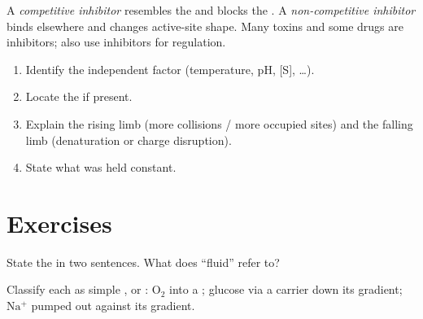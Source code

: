 \begin{definition}[Inhibitors]\label{def:g10:membranes-enzymes:inhibitors}
A \emph{competitive inhibitor} resembles the
 and blocks the . A
\emph{non-competitive inhibitor} binds
elsewhere and changes active-site shape. Many toxins and some drugs are
 inhibitors;  also use inhibitors for regulation.
\end{definition}

\begin{method}\label{met:g10:membranes-enzymes:graph}
\begin{enumerate}
  \item Identify the independent factor (temperature, pH, [S], \dots).
  \item Locate the  if present.
  \item Explain the rising limb (more collisions / more occupied sites)
        and the falling limb (denaturation or charge disruption).
  \item State what was held constant.
\end{enumerate}
\end{method}

\section{Exercises}

\begin{exercise}[$\star$]\label{exo:g10:membranes-enzymes:1}
State the  in two sentences. What does ``fluid''
refer to?
\end{exercise}

\begin{exercise}[$\star$]\label{exo:g10:membranes-enzymes:2}
Classify each as simple ,  or : $\mathrm{O_2}$ into a ; glucose via a carrier down its
gradient; $\mathrm{Na^+}$ pumped out against its gradient.
\end{exercise}

